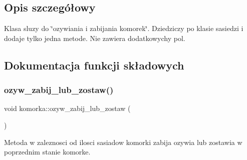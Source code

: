 \subsection{Opis szczegółowy}
Klasa sluzy do \char`\"{}ozywiania i zabijania komorek\char`\"{}. Dziedziczy po klasie sasiedzi i dodaje tylko jedna metode. Nie zawiera dodatkowychy pol. 

\subsection{Dokumentacja funkcji składowych}
\mbox{\label{classkomorka_adce4e335e2839bbb388cfb9f43ddd51e}} 
\subsubsection{\texorpdfstring{ozyw\+\_\+zabij\+\_\+lub\+\_\+zostaw()}{ozyw\_zabij\_lub\_zostaw()}}
{\footnotesize\ttfamily void komorka\+::ozyw\+\_\+zabij\+\_\+lub\+\_\+zostaw (\begin{DoxyParamCaption}{ }\end{DoxyParamCaption})}

Metoda w zaleznosci od ilosci sasiadow komorki zabija ozywia lub zostawia w poprzednim stanie komorke.

